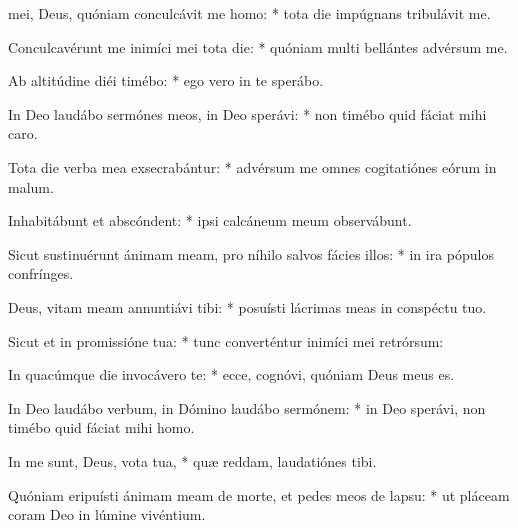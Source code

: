 \begin{psalmus}

 mei, Deus, quóniam conculcávit me homo: * tota die impúgnans tribulávit me.

Conculcavérunt me inimíci mei tota die: * quóniam multi bellántes advérsum me.

Ab altitúdine diéi timébo: * ego vero in te sperábo.

In Deo laudábo sermónes meos, in Deo sperávi: * non timébo quid fáciat mihi caro.

Tota die verba mea exsecrabántur: * advérsum me omnes cogitatiónes eórum in malum.

Inhabitábunt et abscóndent: * ipsi calcáneum meum observábunt.

Sicut sustinuérunt ánimam meam, pro níhilo salvos fácies illos: * in ira pópulos confrínges.

Deus, vitam meam annuntiávi tibi: * posuísti lácrimas meas in conspéctu tuo.

Sicut et in promissióne tua: * tunc converténtur inimíci mei retrórsum:

In quacúmque die invocávero te: * ecce, cognóvi, quóniam Deus meus es.

In Deo laudábo verbum, in Dómino laudábo sermónem: * in Deo sperávi, non timébo quid fáciat mihi homo.

In me sunt, Deus, vota tua, * quæ reddam, laudatiónes tibi.

Quóniam eripuísti ánimam meam de morte, et pedes meos de lapsu: * ut pláceam coram Deo in lúmine vivéntium.

\end{psalmus}
